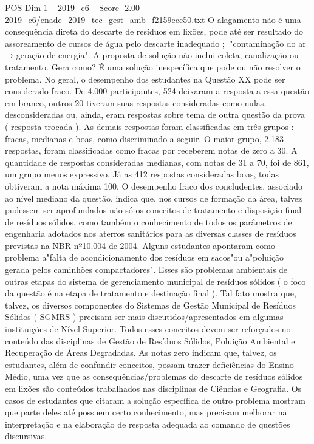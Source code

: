 \begin{textsample}{POS Dim 1 – 2019\_c6 – Score -2.00 – 2019\_c6/enade\_2019\_tec\_gest\_amb\_f2159ecc50.txt}
O alagamento não é uma consequência direta do descarte de resíduos em lixões, pode até ser resultado do assoreamento de cursos de água pelo descarte inadequado ; "contaminação do ar → geração de energia".
A proposta de solução não inclui coleta, canalização ou tratamento.
Gera como?
É uma solução inespecífica que pode ou não resolver o problema.
No geral, o desempenho dos estudantes na Questão XX pode ser considerado fraco.
De 4.000 participantes, 524 deixaram a resposta a essa questão em branco, outros 20 tiveram suas respostas consideradas como nulas, desconsideradas ou, ainda, eram respostas sobre tema de outra questão da prova ( resposta trocada ).
As demais respostas foram classificadas em três grupos : fracas, medianas e boas, como discriminado a seguir.
O maior grupo, 2.183 respostas, foram classificadas como fracas por receberem notas de zero a 30.
A quantidade de respostas consideradas medianas, com notas de 31 a 70, foi de 861, um grupo menos expressivo.
Já as 412 respostas consideradas boas, todas obtiveram a nota máxima 100.
O desempenho fraco dos concludentes, associado ao nível mediano da questão, indica que, nos cursos de formação da área, talvez pudessem ser aprofundados não só os conceitos de tratamento e disposição final de resíduos sólidos, como também o conhecimento de todos os parâmetros de engenharia adotados nos aterros sanitários para as diversas classes de resíduos previstas na NBR nº10.004 de 2004.
Alguns estudantes apontaram como problema a"falta de acondicionamento dos resíduos em sacos"ou a"poluição gerada pelos caminhões compactadores".
Esses são problemas ambientais de outras etapas do sistema de gerenciamento municipal de resíduos sólidos ( o foco da questão é na etapa de tratamento e destinação final ).
Tal fato mostra que, talvez, os diversos componentes do Sistemas de Gestão Municipal de Resíduos Sólidos ( SGMRS ) precisam ser mais discutidos/apresentados em algumas instituições de Nível Superior.
Todos esses conceitos devem ser reforçados no conteúdo das disciplinas de Gestão de Resíduos Sólidos, Poluição Ambiental e Recuperação de Áreas Degradadas.
As notas zero indicam que, talvez, os estudantes, além de confundir conceitos, possam trazer deficiências do Ensino Médio, uma vez que as consequências/problemas do descarte de resíduos sólidos em lixões são conteúdos trabalhados nas disciplinas de Ciências e Geografia.
Os casos de estudantes que citaram a solução específica de outro problema mostram que parte deles até possuem certo conhecimento, mas precisam melhorar na interpretação e na elaboração de resposta adequada ao comando de questões discursivas.

\end{textsample}
